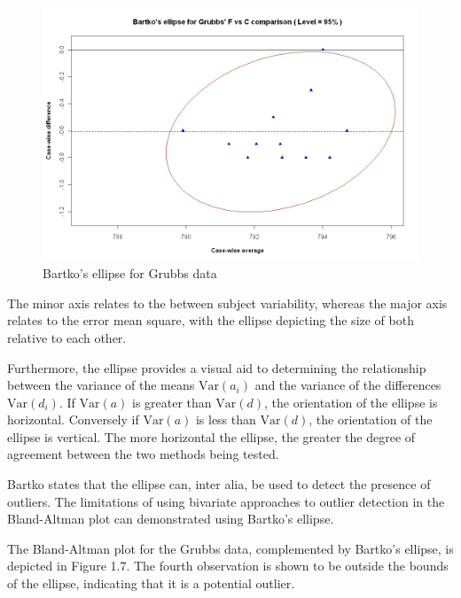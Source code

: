 \documentclass[12pt, a4paper]{report}
\theoremstyle{plain}
\theoremstyle{definition}
\theoremstyle{remark}
\begin{document}

\begin{figure}[h!]
	\includegraphics[width=130mm]{images/GrubbsBartko.jpeg}
	\caption{Bartko's ellipse for Grubbs data}\label{GrubbsBartko}
\end{figure}



The minor axis relates to the between subject variability, whereas
the major axis relates to the error mean square, with the ellipse
depicting the size of both relative to each other.



Furthermore, the ellipse provides a visual aid to determining the relationship between the variance of the means $\mbox{Var}(a_{i})$ and the variance of the differences $\mbox{Var}(d_{i})$. If $\mbox{Var}(a)$ is greater than $\mbox{Var}(d)$, the orientation of the ellipse is horizontal. Conversely if $\mbox{Var}(a)$ is less than $\mbox{Var}(d)$, the orientation of the ellipse is vertical. The more horizontal the ellipse, the greater the degree of agreement between the two methods being tested.


Bartko states that the ellipse can, inter alia, be used to detect the presence of outliers. The limitations of using bivariate approaches to outlier detection in the Bland-Altman plot can demonstrated using Bartko's ellipse.


The Bland-Altman plot for the Grubbs data, complemented by Bartko's ellipse, is depicted in Figure 1.7.
The fourth observation is shown to be outside the bounds of the ellipse, indicating that it is a potential outlier.
\end{document}
